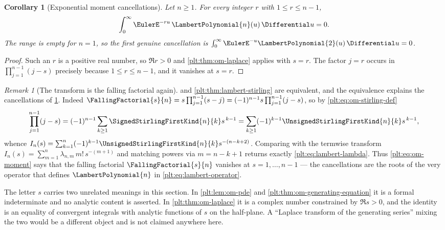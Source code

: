 \documentclass[11pt,oneside]{article}
\theoremstyle{plain}
\newtheorem{corollary}[theorem]{Corollary}
\theoremstyle{definition}
\theoremstyle{remark}
\newtheorem{remark}[theorem]{Remark}
\newcommand{\stirlingone}[2]{\UnsignedStirlingFirstKind{#1}{#2}}
\newcommand{\stirlingsigned}[2]{\SignedStirlingFirstKind{#1}{#2}}
\newcommand{\LamP}[1]{\LambertPolynomial{#1}}
\begin{document}
\begin{corollary}[Exponential moment cancellations]
\label{plt:cor:om-moment-cancellation}
Let \(n\ge1\).  For every integer \(r\) with \(1\le r\le n-1\),
\begin{equation}\label{plt:eq:om-moment}
 \int_{0}^{\infty}\EulerE^{-ru}\,\LamP{n}(u)\,\Differential u=0 .
\end{equation}
The range is empty for \(n=1\), so the first genuine cancellation is
\(\int_0^\infty\EulerE^{-u}\LamP{2}(u)\,\Differential u=0\).
\end{corollary}

\begin{proof}
Such an \(r\) is a positive real number, so \(\Re r>0\) and
\cref{plt:thm:om-laplace} applies with \(s=r\).  The factor \(j=r\) occurs in
\(\prod_{j=1}^{n-1}(j-s)\) precisely because \(1\le r\le n-1\), and it
vanishes at \(s=r\).
\end{proof}

\begin{remark}[The transform is the falling factorial again]
\label{plt:rmk:om-laplace-stirling}
 and \cref{plt:thm:lambert-stirling} are equivalent,
and the equivalence explains the cancellations of
\cref{plt:cor:om-moment-cancellation}.  Indeed
\(\FallingFactorial{s}{n}=s\prod_{j=1}^{n-1}(s-j)
=(-1)^{n-1}s\prod_{j=1}^{n-1}(j-s)\), so by
\eqref{plt:eq:om-stirling-def}
\[
 \prod_{j=1}^{n-1}(j-s)
 =(-1)^{n-1}\sum_{k\ge1}\stirlingsigned{n}{k}s^{\,k-1}
 =\sum_{k\ge1}(-1)^{k-1}\stirlingone{n}{k}s^{\,k-1},
\]
whence
\(I_n(s)=\sum_{k=1}^{n}(-1)^{k-1}\stirlingone{n}{k}s^{-(n-k+2)}\).
Comparing with the termwise transform
\(I_n(s)=\sum_{m=1}^{n}\lambda_{n,m}\,m!\,s^{-(m+1)}\) and matching powers
via \(m=n-k+1\) returns exactly \eqref{plt:eq:lambert-lambda}.  Thus
\eqref{plt:eq:om-moment} says that the falling factorial
\(\FallingFactorial{s}{n}\) vanishes at \(s=1,\ldots,n-1\) --- the
cancellations are the roots of the very operator that defines \(\LamP{n}\) in
\eqref{plt:eq:lambert-operator}.
\end{remark}

\begin{warningbox}
The letter \(s\) carries two unrelated meanings in this section.  In
\cref{plt:lem:om-pde} and \cref{plt:thm:om-generating-equation} it is a
formal indeterminate and no analytic content is asserted.  In
\cref{plt:thm:om-laplace} it is a complex number constrained by
\(\Re s>0\), and the identity is an equality of convergent integrals with
analytic functions of \(s\) on the half-plane.  A ``Laplace transform of the
generating series'' mixing the two would be a different object and is not
claimed anywhere here.
\end{warningbox}
\end{document}
